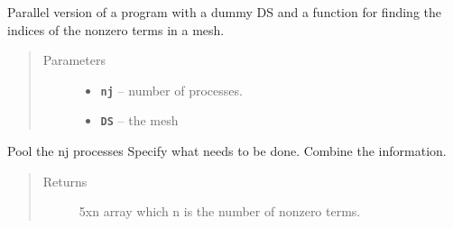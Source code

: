 \documentclass[letterpaper,10pt,english]{sphinxmanual}
\begin{document}

\begin{fulllineitems}
\label{index:DictionarySparseMatrix.parnonzero}
Parallel version of a program with a dummy DS and a function for   finding the indices of the nonzero terms in a mesh.
\begin{quote}\begin{description}
\item[{Parameters}] \leavevmode\begin{itemize}
\item {} 
\textbf{\texttt{nj}} -- number of processes.

\item {} 
\textbf{\texttt{DS}} -- the mesh

\end{itemize}

\end{description}\end{quote}

Pool the nj processes
Specify what needs to be done.
Combine the information.
\begin{quote}\begin{description}
\item[{Returns}] \leavevmode
5xn array which n is the number of nonzero terms.

\end{description}\end{quote}

\end{fulllineitems}

\end{document}
